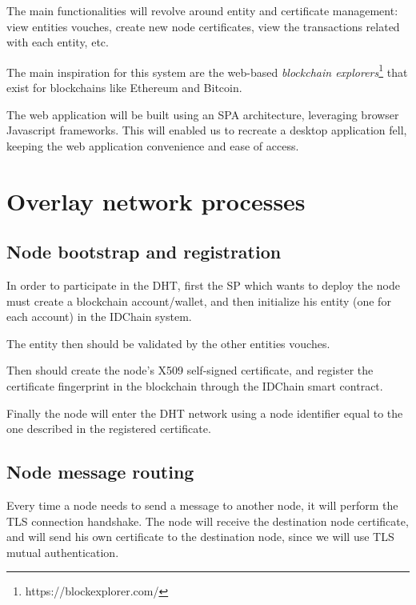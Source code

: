 {The main functionalities will revolve around entity and certificate management: view entities vouches, create new node certificates, view the transactions related with each entity, etc.

The main inspiration for this system are the web-based \textit{blockchain explorers}\footnote{https://blockexplorer.com/} that exist for blockchains like Ethereum and Bitcoin.

The web application will be built using an \ac{SPA} architecture, leveraging browser Javascript frameworks.
This will enabled us to recreate a desktop application fell, keeping the web application convenience and ease of access.

\section{Overlay network processes}

\subsection{Node bootstrap and registration}
In order to participate in the DHT, first the \ac{SP} which wants to deploy the node must create a blockchain account/wallet, and then initialize his entity (one for each account) in the IDChain system.

The entity then should be validated by the other entities vouches.

Then should create the node's X509 self-signed certificate, and register the certificate fingerprint in the blockchain through the IDChain smart contract.

Finally the node will enter the DHT network using a node identifier equal to the one described in the registered certificate.




\subsection{Node message routing}
Every time a node needs to send a message to another node, it will perform the TLS connection handshake.
The node will receive the destination node certificate, and will send his own certificate to the destination node, since we will use TLS mutual authentication.

}
